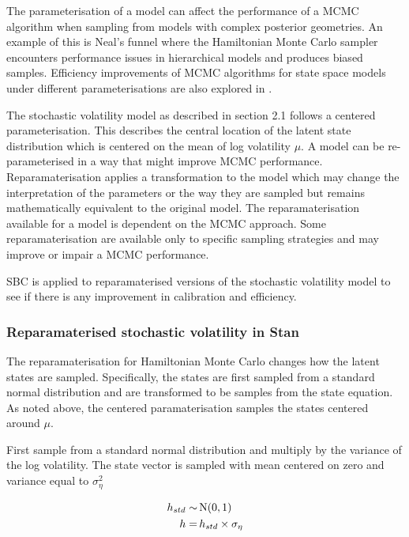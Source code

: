 \documentclass[12pt, a4paper]{article}
\begin{document}
        The parameterisation of a model can affect the performance of a MCMC algorithm when sampling from models with complex posterior geometries. An example of this is Neal's funnel \citep{neal2003slice} where the Hamiltonian Monte Carlo sampler encounters performance issues in hierarchical models and produces biased samples. Efficiency improvements of MCMC algorithms for state space models under different parameterisations are also explored in \citet{strickland2008parameterisation}.

        The stochastic volatility model as described in section 2.1 follows a centered parameterisation. This describes the central location of the latent state distribution which is centered on the mean of log volatility $\mu$. A model can be re-parameterised in a way that might improve MCMC performance. Reparamaterisation applies a transformation to the model which may change the interpretation of the parameters or the way they are sampled but remains mathematically equivalent to the original model. The reparamaterisation available for a model is dependent on the MCMC approach. Some reparamaterisation are available only to specific sampling strategies and may improve or impair a MCMC performance. 

        SBC is applied to reparamaterised versions of the stochastic volatility model to see if there is any improvement in calibration and efficiency. 
        
        \subsubsection{Reparamaterised stochastic volatility in Stan}
        The reparamaterisation for Hamiltonian Monte Carlo changes how the latent states are sampled. Specifically, the states are first sampled from a standard normal distribution and are transformed to be samples from the state equation. As noted above, the centered paramaterisation samples the states centered around $\mu$.  

        First sample from a standard normal distribution and multiply by the variance of the log volatility. The state vector is sampled with mean centered on zero and variance equal to $\sigma_{\eta}^2$

        $$
        \begin{aligned}
        h_{std} \sim&\space \,\mathrm{N}(0,1) \\
        h =& \space \, h_{std} \times \sigma_{\eta}
        \end{aligned}
        $$
        
\end{document}
